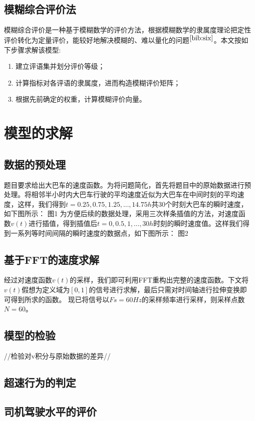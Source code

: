 \documentclass[bwprint]{cumcmthesis}
\begin{document}
        \subsection{模糊综合评价法}
        模糊综合评价是一种基于模糊数学的评价方法，根据模糊数学的隶属度理论把定性评价转化为定量评价，能较好地解决模糊的、难以量化的问题$^{\cite{bib:six}}$。本文按如下步骤求解该模型:
        \begin{enumerate}
            \item 建立评语集并划分评价等级；
            \item 计算指标对各评语的隶属度，进而构造模糊评价矩阵；
            \item 根据先前确定的权重，计算模糊评价向量。
        \end{enumerate}
    \section{模型的求解}
        \subsection{数据的预处理}
        题目要求给出大巴车的速度函数。为将问题简化，首先将题目中的原始数据进行预处理。将相邻半小时内大巴车行驶的平均速度近似为大巴车在中间时刻的平均速度，这样，我们得到$t=0.25, 0.75, 1.25,\dots, 14.75h$共$30$个时刻大巴车的瞬时速度，如下图所示：
        图1
        为方便后续的数据处理，采用三次样条插值的方法，对速度函数$v(t)$进行插值，得到插值后$t=0, 0.5, 1,\dots, 30h$时刻的瞬时速度值。这样我们得到一系列等时间间隔的瞬时速度的数据点，如下图所示：
        图2
        
        \subsection{基于FFT的速度求解}
        经过对速度函数$v(t)$的采样，我们即可利用FFT重构出完整的速度函数。下文将$v(t)$假想为定义域为$[0,1]$的信号进行求解，最后只需对时间轴进行拉伸变换即可得到所求的函数。
    现已将信号以$Fs=60Hz$的采样频率进行采样，则采样点数$N=60$。

        \subsection{模型的检验}
        //检验对v积分与原始数据的差异//
        \subsection{超速行为的判定}
        \subsection{司机驾驶水平的评价}
\end{document}
